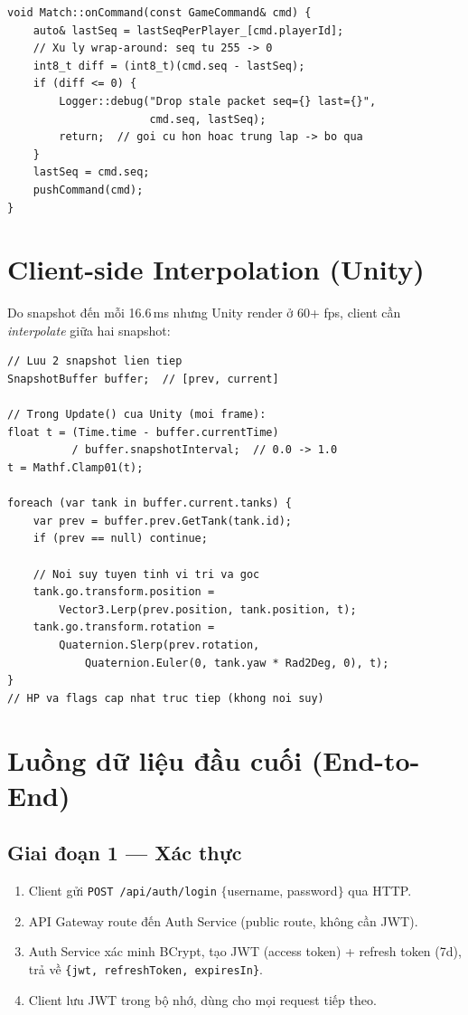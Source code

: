 \documentclass[12pt,a4paper]{report}
\begin{document}
\begin{lstlisting}[style=cppStyle, caption={Bỏ qua gói tin đến muộn (out-of-order)}, label={lst:seqcheck}]
void Match::onCommand(const GameCommand& cmd) {
    auto& lastSeq = lastSeqPerPlayer_[cmd.playerId];
    // Xu ly wrap-around: seq tu 255 -> 0
    int8_t diff = (int8_t)(cmd.seq - lastSeq);
    if (diff <= 0) {
        Logger::debug("Drop stale packet seq={} last={}",
                      cmd.seq, lastSeq);
        return;  // goi cu hon hoac trung lap -> bo qua
    }
    lastSeq = cmd.seq;
    pushCommand(cmd);
}
\end{lstlisting}

\section{Client-side Interpolation (Unity)}

Do snapshot đến mỗi 16.6\,ms nhưng Unity render ở 60+ fps, client cần \textit{interpolate} giữa hai snapshot:

\begin{lstlisting}[style=bashStyle, caption={Cơ chế interpolation ở Unity client (C#)}, label={lst:interpolation}]
// Luu 2 snapshot lien tiep
SnapshotBuffer buffer;  // [prev, current]

// Trong Update() cua Unity (moi frame):
float t = (Time.time - buffer.currentTime)
          / buffer.snapshotInterval;  // 0.0 -> 1.0
t = Mathf.Clamp01(t);

foreach (var tank in buffer.current.tanks) {
    var prev = buffer.prev.GetTank(tank.id);
    if (prev == null) continue;

    // Noi suy tuyen tinh vi tri va goc
    tank.go.transform.position =
        Vector3.Lerp(prev.position, tank.position, t);
    tank.go.transform.rotation =
        Quaternion.Slerp(prev.rotation,
            Quaternion.Euler(0, tank.yaw * Rad2Deg, 0), t);
}
// HP va flags cap nhat truc tiep (khong noi suy)
\end{lstlisting}

\section{Luồng dữ liệu đầu cuối (End-to-End)}

\subsection{Giai đoạn 1 --- Xác thực}

\begin{enumerate}
  \item Client gửi \texttt{POST /api/auth/login} $\{$username, password$\}$ qua HTTP.
  \item API Gateway route đến Auth Service (public route, không cần JWT).
  \item Auth Service xác minh BCrypt, tạo JWT (access token) + refresh token (7d), trả về \texttt{\{jwt, refreshToken, expiresIn\}}.
  \item Client lưu JWT trong bộ nhớ, dùng cho mọi request tiếp theo.
\end{enumerate}
\end{document}
